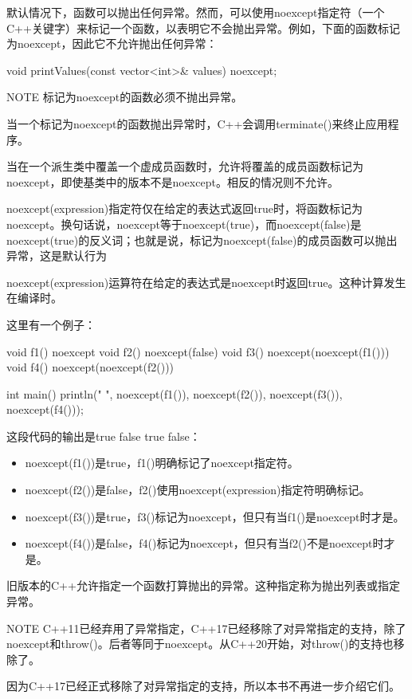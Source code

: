 
默认情况下，函数可以抛出任何异常。然而，可以使用noexcept指定符（一个C++关键字）来标记一个函数，以表明它不会抛出异常。例如，下面的函数标记为noexcept，因此它不允许抛出任何异常：

\begin{cpp}
void printValues(const vector<int>& values) noexcept;
\end{cpp}

\begin{myNotic}{NOTE}
标记为noexcept的函数必须不抛出异常。
\end{myNotic}

当一个标记为noexcept的函数抛出异常时，C++会调用terminate()来终止应用程序。

当在一个派生类中覆盖一个虚成员函数时，允许将覆盖的成员函数标记为noexcept，即使基类中的版本不是noexcept。相反的情况则不允许。


noexcept(expression)指定符仅在给定的表达式返回true时，将函数标记为noexcept。换句话说，noexcept等于noexcept(true)，而noexcept(false)是noexcept(true)的反义词；也就是说，标记为noexcept(false)的成员函数可以抛出异常，这是默认行为


noexcept(expression)运算符在给定的表达式是noexcept时返回true。这种计算发生在编译时。

这里有一个例子：

\begin{cpp}
void f1() noexcept {}
void f2() noexcept(false) {}
void f3() noexcept(noexcept(f1())) {}
void f4() noexcept(noexcept(f2())) {}

int main()
{
    println("{} {} {} {}", noexcept(f1()),
                           noexcept(f2()),
                           noexcept(f3()),
                           noexcept(f4()));
}
\end{cpp}

这段代码的输出是true false true false：

\begin{itemize}
\item
noexcept(f1())是true，f1()明确标记了noexcept指定符。

\item
noexcept(f2())是false，f2()使用noexcept(expression)指定符明确标记。

\item
noexcept(f3())是true，f3()标记为noexcept，但只有当f1()是noexcept时才是。

\item
noexcept(f4())是false，f4()标记为noexcept，但只有当f2()不是noexcept时才是。
\end{itemize}


旧版本的C++允许指定一个函数打算抛出的异常。这种指定称为抛出列表或指定异常。

\begin{myNotic}{NOTE}
C++11已经弃用了异常指定，C++17已经移除了对异常指定的支持，除了noexcept和throw()。后者等同于noexcept。从C++20开始，对throw()的支持也移除了。
\end{myNotic}

因为C++17已经正式移除了对异常指定的支持，所以本书不再进一步介绍它们。

